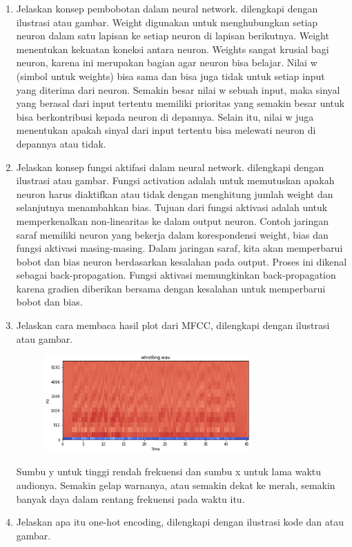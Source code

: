 \begin{enumerate}
\begin{figure}[H]
		\centering
	\end{figure}
	\item Jelaskan konsep pembobotan dalam neural network. dilengkapi dengan ilustrasi atau gambar.
	\hfill\break
	Weight digunakan untuk menghubungkan setiap neuron dalam satu lapisan ke setiap neuron di lapisan berikutnya. Weight menentukan kekuatan koneksi antara neuron. Weights sangat krusial bagi neuron, karena ini merupakan bagian agar neuron bisa belajar. Nilai w (simbol untuk weights) bisa sama dan bisa juga tidak untuk setiap input yang diterima dari neuron. Semakin besar nilai w sebuah input, maka sinyal yang berasal dari input tertentu memiliki prioritas yang semakin besar untuk bisa berkontribusi kepada neuron di depannya. Selain itu, nilai w juga menentukan apakah sinyal dari input tertentu bisa melewati neuron di depannya atau tidak.
	\item Jelaskan konsep fungsi aktifasi dalam neural network.  dilengkapi dengan ilustrasi atau gambar.
	\hfill\break
	Fungsi activation adalah untuk memutuskan apakah neuron harus diaktifkan atau tidak dengan menghitung jumlah weight dan selanjutnya menambahkan bias. Tujuan dari fungsi aktivasi adalah untuk memperkenalkan non-linearitas ke dalam output neuron. Contoh jaringan saraf memiliki neuron yang bekerja dalam korespondensi weight, bias dan fungsi aktivasi masing-masing. Dalam jaringan saraf, kita akan memperbarui bobot dan bias neuron berdasarkan kesalahan pada output. Proses ini dikenal sebagai back-propagation. Fungsi aktivasi memungkinkan back-propagation karena gradien diberikan bersama dengan kesalahan untuk memperbarui bobot dan bias.
	\item Jelaskan cara membaca hasil plot dari MFCC, dilengkapi dengan ilustrasi atau gambar.
	\hfill\break
	\begin{figure}[H]
		\includegraphics[width=8cm]{figures/1174006/chapter6/praktek/1-2.png}
		\centering
	\end{figure}
	Sumbu y untuk tinggi rendah frekuensi dan sumbu x untuk lama waktu audionya. Semakin gelap warnanya, atau semakin dekat ke merah, semakin banyak daya dalam rentang frekuensi pada waktu itu.
	\item Jelaskan apa itu one-hot encoding, dilengkapi dengan  ilustrasi kode dan atau gambar.

\end{enumerate}
